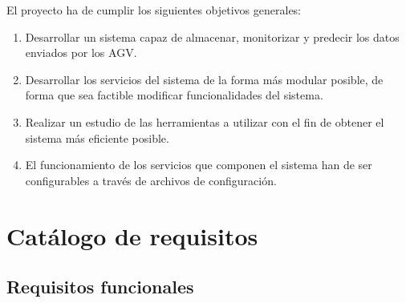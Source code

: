 El proyecto ha de cumplir los siguientes objetivos generales:
\begin{enumerate}
	\item Desarrollar un sistema capaz de almacenar, monitorizar y predecir los datos enviados por los AGV.
	\item Desarrollar los servicios del sistema de la forma más modular posible, de forma que sea factible modificar
		funcionalidades del sistema.
	\item Realizar un estudio de las herramientas a utilizar con el fin de obtener el sistema más eficiente posible.
	\item El funcionamiento de los servicios que componen el sistema han de ser configurables a través de archivos de
		configuración.
\end{enumerate}

\section{Catálogo de requisitos}

\subsection{Requisitos funcionales}

